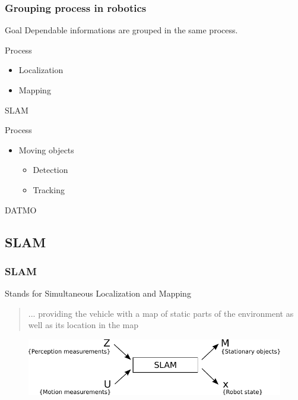 \documentclass{beamer}
\begin{document}
	\begin{frame}
		\frametitle{Grouping process in robotics}
		
		\begin{block}{Goal}		
			Dependable informations are grouped in the same process.
		\end{block}			
		
		\begin{exampleblock}{Process}		
		
			\begin{itemize}
			\item Localization
			\item Mapping
			\end{itemize}			
		
			SLAM
		\end{exampleblock}					
				
		\begin{exampleblock}{Process}		
			\begin{itemize}
			\item Moving objects
				\begin{itemize}
				\item Detection
				\item Tracking
				\end{itemize}			
			\end{itemize}			
			DATMO
		\end{exampleblock}						
				
	\end{frame}

	\subsection{SLAM}
		\begin{frame}
			\frametitle{SLAM}
			
			\begin{block}{Stands for}				
				Simultaneous Localization and Mapping
			\end{block}
			
			\begin{quotation}
				... providing the vehicle with a map of static parts of the environment as well as its location in the map \cite{DBLP:journals/inffus/VuBA11}
			\end{quotation}			
			
			\begin{figure}[h]
				\center
				\includegraphics[scale=0.8]{../img/fig:perception:slam}
			 \end{figure}			
			
		\end{frame}
	
\end{document}
